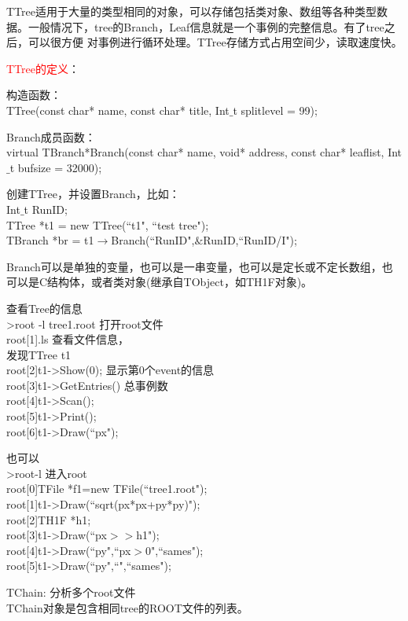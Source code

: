 \documentclass[12pt,a4paper]{article}
\begin{document}
TTree适用于大量的类型相同的对象，可以存储包括类对象、数组等各种类型数据。一般情况下，tree的Branch，Leaf信息就是一个事例的完整信息。有了tree之后，可以很方便 对事例进行循环处理。TTree存储方式占用空间少，读取速度快。

\textcolor{red}{TTree的定义}：

构造函数：\\
TTree(const char* name, const char* title, Int$\_$t splitlevel = 99);

Branch成员函数：\\
virtual TBranch*Branch(const char* name, void* address, const char* leaflist, Int$\_$t bufsize = 32000);


创建TTree，并设置Branch，比如：\\
Int$\_$t RunID; \\
TTree *t1 = new TTree(``t1", ``test tree"); \\
TBranch *br = t1$\rightarrow$Branch(``RunID",$\&$RunID,``RunID/I");

Branch可以是单独的变量，也可以是一串变量，也可以是定长或不定长数组，也可以是C结构体，或者类对象(继承自TObject，如TH1F对象)。

 查看Tree的信息 \\
 >root -l tree1.root 打开root文件 \\
 root[1].ls 查看文件信息，\\
发现TTree t1 \\
root[2]t1->Show(0); 显示第0个event的信息 \\
root[3]t1->GetEntries() 总事例数 \\
root[4]t1->Scan(); \\
root[5]t1->Print(); \\
root[6]t1->Draw(``px");

也可以 \\
>root-l 进入root \\
root[0]TFile *f1=new TFile(``tree1.root"); \\
root[1]t1->Draw(``sqrt(px*px+py*py)"); \\
root[2]TH1F *h1; \\
root[3]t1->Draw(``px$>>$h1"); \\
root[4]t1->Draw(``py",``px$>0$",``sames"); \\
root[5]t1->Draw(``py",``",``sames");

TChain: 分析多个root文件 \\
TChain对象是包含相同tree的ROOT文件的列表。\\
\end{document}
